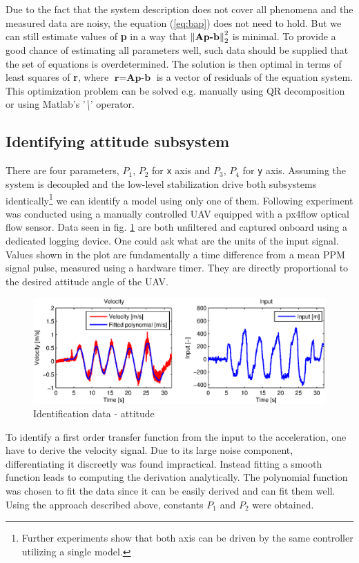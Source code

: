 Due to the fact that the system description does not cover all phenomena and the measured data are noisy, the equation (\ref{eq:bap}) does not need to hold. But we can still estimate values of \textbf{p} in a way that $\left\lVert\textbf{Ap-b}\right\rVert_2^2$ is minimal. To provide a good chance of estimating all parameters well, such data should be supplied that the set of equations is overdetermined. The solution is then optimal in terms of least squares of \textbf{r}, where $\textbf{r} = \textbf{Ap-b}$ is a vector of residuals of the equation system. This optimization problem can be solved e.g. manually using QR decomposition or using Matlab's '\textit{\textbackslash}' operator.

\subsection{Identifying attitude subsystem}

There are four parameters, $P_1$, $P_2$ for \texttt{x} axis and $P_3$, $P_4$ for \texttt{y} axis. Assuming the system is decoupled and the low-level stabilization drive both subsystems identically\footnote{Further experiments show that both axis can be driven by the same controller utilizing a single model.} we can identify a model using only one of them. Following experiment was conducted using a manually controlled UAV equipped with a px4flow optical flow sensor. Data seen in fig. \ref{fig:iden1} are both unfiltered and captured onboard using a dedicated logging device. One could ask what are the units of the input signal. Values shown in the plot are fundamentally a time difference from a mean PPM signal pulse, measured using a hardware timer. They are directly proportional to the desired attitude angle of the UAV.

\begin{figure}[h]
\includegraphics[width=1\textwidth]{fig/iden1.eps} 
\caption{Identification data - attitude}
\label{fig:iden1}
\end{figure}

To identify a first order transfer function from the input to the acceleration, one have to derive the velocity signal. Due to its large noise component, differentiating it discreetly was found impractical. Instead fitting a smooth function leads to computing the derivation analytically. The polynomial function was chosen to fit the data since it can be easily derived and can fit them well. Using the approach described above, constants $P_1$ and $P_2$ were obtained.

